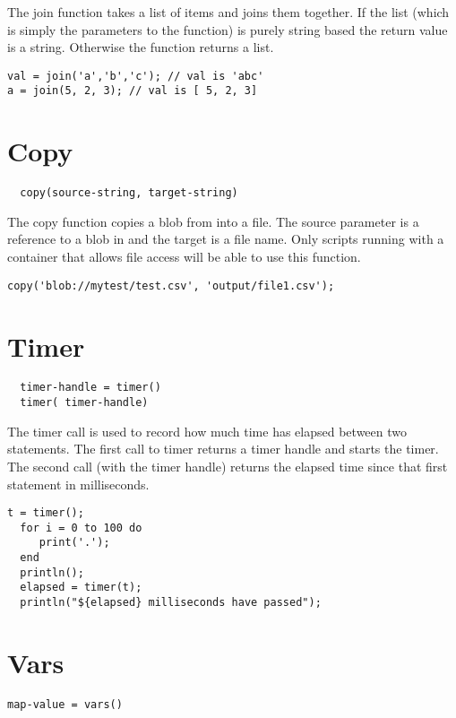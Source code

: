 The join function takes a list of items and joins them together. If the
list (which is simply the parameters to the function) is purely string based the return
value is a string. Otherwise the function returns a list.

\begin{lstlisting}[caption={join example}]
val = join('a','b','c'); // val is 'abc'
a = join(5, 2, 3); // val is [ 5, 2, 3]
\end{lstlisting}


\section{Copy}
\begin{Verbatim}
  copy(source-string, target-string)
\end{Verbatim}

The copy function copies a blob from \Rapture into a file. The source parameter is
a reference to a blob in \Rapture and the target is a file name. Only scripts running
with a container that allows file access will be able to use this function.

\begin{lstlisting}[caption={copy example}]
copy('blob://mytest/test.csv', 'output/file1.csv');
\end{lstlisting}

\section{Timer}
\begin{Verbatim}
  timer-handle = timer()
  timer( timer-handle)
\end{Verbatim}

The timer call is used to record how much time has elapsed between two
\Reflex statements. The first call to timer returns a timer handle and starts
the timer. The second call (with the timer handle) returns the elapsed time since
that first statement in milliseconds.

\begin{lstlisting}[caption={timer example}]
  t = timer();
  for i = 0 to 100 do
     print('.');
  end
  println();
  elapsed = timer(t);
  println("${elapsed} milliseconds have passed");
\end{lstlisting}

\section{Vars}
\begin{Verbatim}
map-value = vars()
\end{Verbatim}

